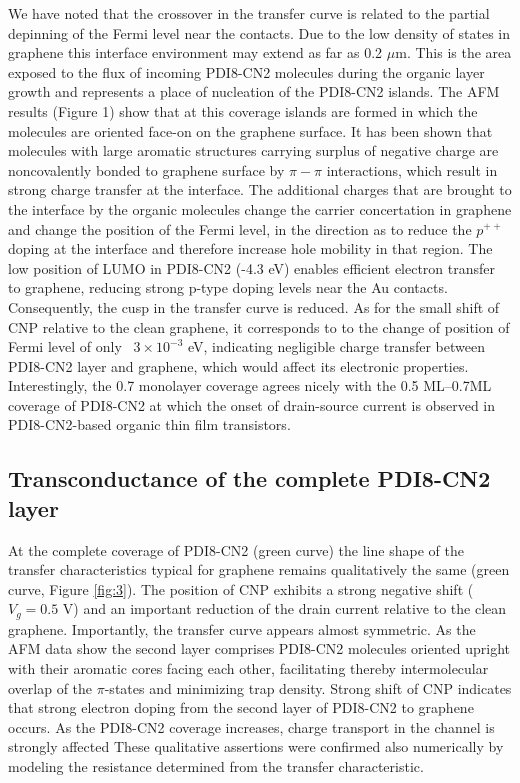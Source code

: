 \documentclass[preprint,aip,jap]{revtex4-2}
\begin{document}
 We have noted that the crossover in the transfer curve is related to the partial depinning of the Fermi level near the contacts.
 Due to the low density of states in graphene this interface environment may extend as far as 0.2 $\mu$m\cite{mueller-2009}.
 This is the area exposed to the flux of incoming PDI8-CN2 molecules during the organic layer growth and represents a place of nucleation of the PDI8-CN2 islands.
 The AFM results (Figure 1) show that at this coverage islands are formed in which the molecules are oriented face-on on the graphene surface.
 It has been shown\cite{su-2009} that molecules with large aromatic structures carrying surplus of negative charge are noncovalently bonded to graphene surface by $\pi-\pi$ interactions, which result in strong charge transfer at the interface.
 The additional charges that are brought to the interface by the organic molecules change the carrier concertation in graphene and change the position of the Fermi level, in the direction as to reduce the $p^{++}$ doping at the interface and therefore increase hole mobility in that region.
 The low position of LUMO in PDI8-CN2 (-4.3 eV)\cite{jones-2007} enables efficient electron transfer to graphene, reducing strong p-type doping levels near the Au contacts.
 Consequently, the cusp in the transfer curve is reduced.
   As for the small shift of CNP relative to the clean graphene, it corresponds to to the change of position of Fermi level of only ~$3\times10^{-3}$ eV, indicating negligible charge transfer between PDI8-CN2 layer and graphene, which would affect its electronic properties.
 Interestingly, the 0.7 monolayer coverage agrees nicely with the 0.5 ML--0.7ML coverage of PDI8-CN2 at which the onset of  drain-source current is observed in PDI8-CN2-based organic thin film transistors\cite{liscio-2013}.
 

\subsection{Transconductance of the complete PDI8-CN2 layer}
\label{sec:complete}

At the complete coverage of PDI8-CN2 (green curve) the line shape of the transfer characteristics typical for graphene remains qualitatively the same (green curve, Figure \ref{fig:3}).
  The position of CNP exhibits a strong negative shift ($V_g=0.5$ V) and an important reduction of the drain current relative to the clean graphene.
 Importantly, the transfer curve appears almost symmetric.
  As the AFM data show the second layer comprises PDI8-CN2 molecules oriented upright with their aromatic cores facing each other, facilitating thereby intermolecular overlap of the $\pi$-states and minimizing trap density.
  Strong shift of CNP indicates that strong electron doping from the second layer of PDI8-CN2 to  graphene occurs.
 As the PDI8-CN2 coverage increases, charge transport in the channel is strongly affected
These qualitative assertions were confirmed also numerically by modeling the resistance determined from the transfer characteristic.
 
\end{document}
